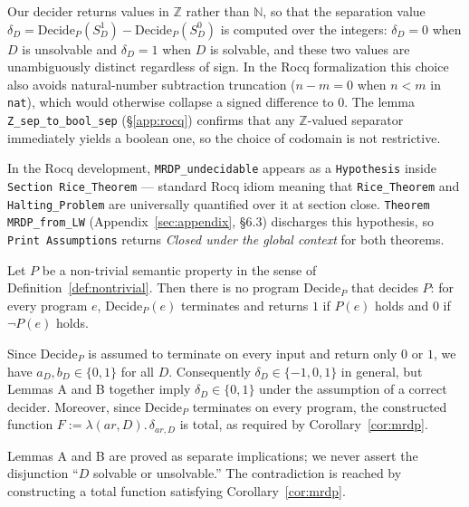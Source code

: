 \documentclass{lmcs}
\begin{document}
Our decider returns values in $\mathbb{Z}$ rather than $\mathbb{N}$,
so that the separation value $\delta_D = \mathrm{Decide}_P(S_D^1) -
\mathrm{Decide}_P(S_D^0)$ is computed over the integers: $\delta_D =
0$ when $D$ is unsolvable and $\delta_D = 1$ when $D$ is solvable,
and these two values are unambiguously distinct regardless of sign.
In the Rocq formalization this choice also avoids natural-number
subtraction truncation ($n - m = 0$ when $n < m$ in \texttt{nat}),
which would otherwise collapse a signed difference to $0$.
The lemma \texttt{Z\_sep\_to\_bool\_sep} (§\ref{app:rocq}) confirms
that any $\mathbb{Z}$-valued separator immediately yields a boolean
one, so the choice of codomain is not restrictive.

In the Rocq development, \texttt{MRDP\_undecidable} appears as a
\texttt{Hypothesis} inside \texttt{Section Rice\_Theorem} --- standard
Rocq idiom meaning that \texttt{Rice\_Theorem} and
\texttt{Halting\_Problem} are universally quantified over it at section
close. \texttt{Theorem MRDP\_from\_LW} (Appendix~\ref{sec:appendix},
§6.3) discharges this hypothesis, so \texttt{Print Assumptions}
returns \emph{Closed under the global context} for both theorems.

\begin{thm}
\label{thm:rice}
Let \(P\) be a non-trivial semantic property in the sense of
Definition~\ref{def:nontrivial}. Then there is no program \(\mathrm{Decide}_P\)
that decides \(P\): for every program \(e\), \(\mathrm{Decide}_P(e)\) terminates
and returns \(1\) if \(P(e)\) holds and \(0\) if \(\neg P(e)\) holds.
\end{thm}

\begin{rem}
\label{rem:codomain}
Since $\mathrm{Decide}_P$ is assumed to terminate on every input and return
only $0$ or $1$, we have $a_D, b_D \in \{0,1\}$ for all $D$. Consequently
$\delta_D \in \{-1, 0, 1\}$ in general, but Lemmas A and B together
imply $\delta_D \in \{0,1\}$ under the assumption of a correct decider.
Moreover, since $\mathrm{Decide}_P$ terminates on every program, the
constructed function $F := \lambda(ar, D).\, \delta_{ar,D}$ is total,
as required by Corollary~\ref{cor:mrdp}.
\end{rem}

\begin{rem}
\label{rem:case-analysis}
Lemmas A and B are proved as separate implications; we never assert the
disjunction ``$D$ solvable or unsolvable.'' The contradiction is reached
by constructing a total function satisfying Corollary~\ref{cor:mrdp}.
\end{rem}
\end{document}

